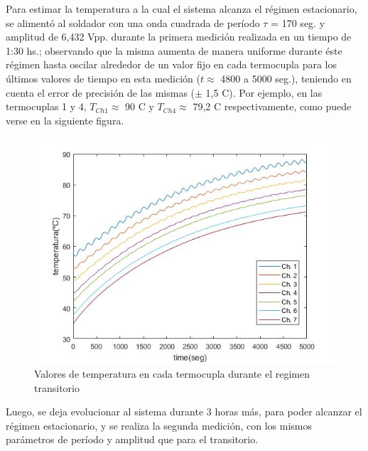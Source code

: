 \documentclass[twoside,twocolumn,a4paper]{article}
\begin{document}
Para estimar la temperatura a la cual el sistema alcanza el r\'egimen estacionario, se aliment\'o al soldador con una onda cuadrada de per\'iodo $\tau$ = 170 seg. y amplitud de 6,432 Vpp. durante la primera medici\'on realizada en un tiempo de 1:30 hs.; observando que la misma aumenta de manera uniforme durante \'este r\'egimen hasta oscilar alrededor de un valor fijo en cada termocupla para los \'ultimos valores de tiempo en esta medici\'on ($t \approx$ 4800 a 5000 seg.), teniendo en cuenta el error de precisi\'on de las mismas ($\pm$ 1,5 \degree C). Por ejemplo, en las termocuplas 1 y 4, $T_{Ch 1} \approx$  90 \degree C y $T_{Ch 4} \approx$ 79,2 \degree C respectivamente, como puede verse en la siguiente figura.

\begin{figure}[H]
\includegraphics[width=\linewidth]{Tvst_transitorio.jpg}
\caption{Valores de temperatura en cada termocupla durante el regimen transitorio}
\label{fig:Tvst_transitorio}
\end{figure}


Luego, se deja evolucionar al sistema durante 3 horas m\'as, para poder alcanzar el r\'egimen estacionario, y se realiza la segunda medici\'on, con los mismos par\'ametros de per\'iodo y amplitud que para el transitorio.
\end{document}
